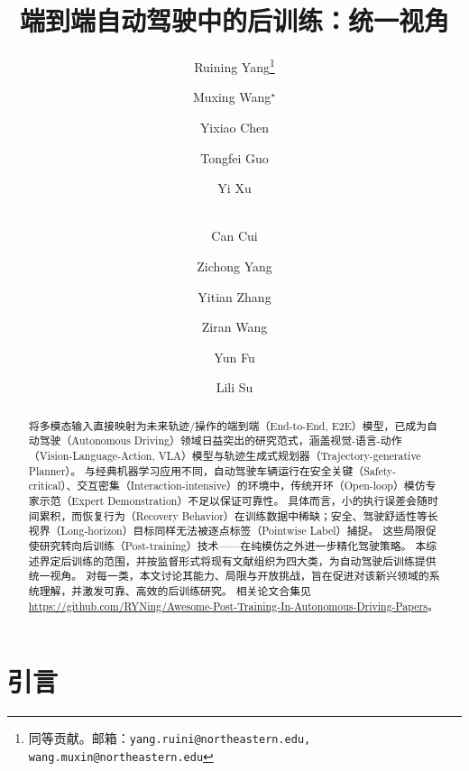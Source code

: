 \documentclass[runningheads]{llncs}
\begin{document}
\title{端到端自动驾驶中的后训练：统一视角}


\author{Ruining Yang\thanks{同等贡献。邮箱：\texttt{yang.ruini@northeastern.edu, wang.muxin@northeastern.edu}} 
\and Muxing Wang$^{\star}$
\and Yixiao Chen
\and Tongfei Guo
\and Yi Xu
\and \\
Can Cui
\and Zichong Yang
\and Yitian Zhang
\and Ziran Wang
\and Yun Fu
\and Lili Su
}




\maketitle


\begin{abstract}

将多模态输入直接映射为未来轨迹/操作的端到端（End-to-End, E2E）模型，已成为自动驾驶（Autonomous Driving）领域日益突出的研究范式，涵盖视觉-语言-动作（Vision-Language-Action, VLA）模型与轨迹生成式规划器（Trajectory-generative Planner）。
与经典机器学习应用不同，自动驾驶车辆运行在安全关键（Safety-critical）、交互密集（Interaction-intensive）的环境中，传统开环（Open-loop）模仿专家示范（Expert Demonstration）不足以保证可靠性。
具体而言，小的执行误差会随时间累积，而恢复行为（Recovery Behavior）在训练数据中稀缺；安全、驾驶舒适性等长视界（Long-horizon）目标同样无法被逐点标签（Pointwise Label）捕捉。
这些局限促使研究转向后训练（Post-training）技术——在纯模仿之外进一步精化驾驶策略。
本综述界定后训练的范围，并按监督形式将现有文献组织为四大类，为自动驾驶后训练提供统一视角。
对每一类，本文讨论其能力、局限与开放挑战，旨在促进对该新兴领域的系统理解，并激发可靠、高效的后训练研究。
相关论文合集见 \url{https://github.com/RYNing/Awesome-Post-Training-In-Autonomous-Driving-Papers}。



\end{abstract}

\section{引言}
\label{sec:intro}
\end{document}
